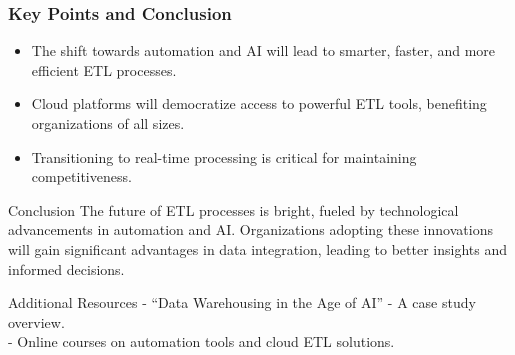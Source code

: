 \documentclass[aspectratio=169]{beamer}
\begin{document}
\begin{frame}[fragile]
    \frametitle{Key Points and Conclusion}
    \begin{itemize}
        \item The shift towards automation and AI will lead to smarter, faster, and more efficient ETL processes.
        \item Cloud platforms will democratize access to powerful ETL tools, benefiting organizations of all sizes.
        \item Transitioning to real-time processing is critical for maintaining competitiveness.
    \end{itemize}

    \begin{block}{Conclusion}
        The future of ETL processes is bright, fueled by technological advancements in automation and AI. Organizations adopting these innovations will gain significant advantages in data integration, leading to better insights and informed decisions.
    \end{block}

    \begin{block}{Additional Resources}
        - “Data Warehousing in the Age of AI” - A case study overview.\\
        - Online courses on automation tools and cloud ETL solutions.
    \end{block}
\end{frame}
\end{document}
